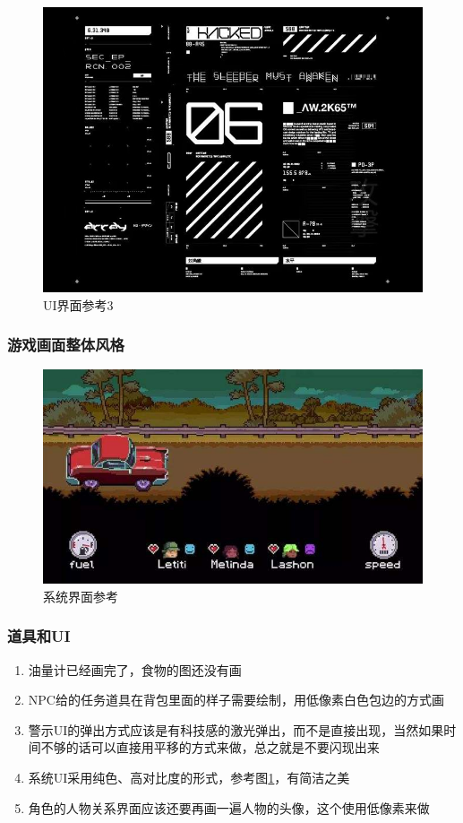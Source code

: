 \documentclass{ctexart}
\begin{document}
			\begin{figure}[H]
				\centering
				\includegraphics[scale=0.35]{material/UI设计参考4.jpeg}
				\caption{UI界面参考3}
				\label{UI简洁图}
			\end{figure}
			\subsubsection{游戏画面整体风格}
			\begin{figure}[H]
				\centering
				\includegraphics[scale=0.5]{material/DeathTripToCanada.jpeg}
				\caption{系统界面参考}
			\end{figure}
			\subsubsection{道具和UI}
			\begin{enumerate}
				\item 油量计已经画完了，食物的图还没有画
				\item NPC给的任务道具在背包里面的样子需要绘制，用低像素白色包边的方式画
				\item 警示UI的弹出方式应该是有科技感的激光弹出，而不是直接出现，当然如果时间不够的话可以直接用平移的方式来做，总之就是不要闪现出来
				\item 系统UI采用纯色、高对比度的形式，参考图\ref{UI简洁图}，有简洁之美
				\item 角色的人物关系界面应该还要再画一遍人物的头像，这个使用低像素来做
			\end{enumerate}
\end{document}
